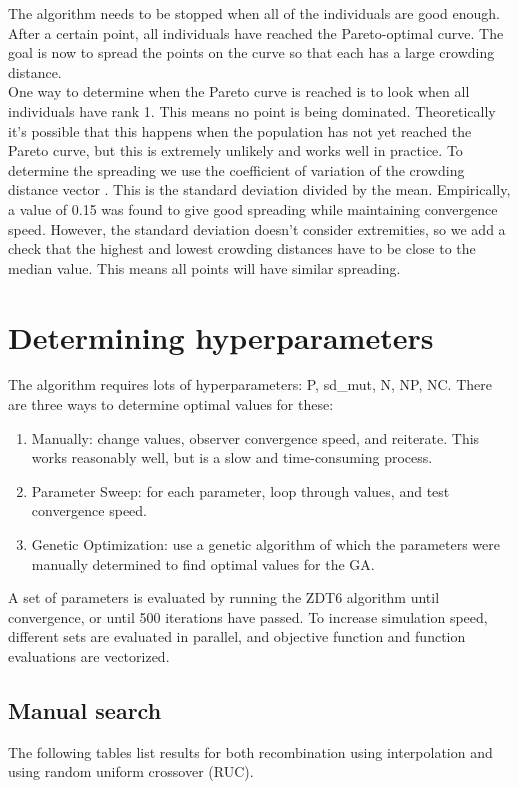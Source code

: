 The algorithm needs to be stopped when all of the individuals are good enough. After a certain point, all individuals have reached the Pareto-optimal curve. The goal is now to spread the points on the curve so that each has a large crowding distance. \\
One way to determine when the Pareto curve is reached is to look when all individuals have rank 1. This means no point is being dominated. Theoretically it's possible that this happens when the population has not yet reached the Pareto curve, but this is extremely unlikely and works well in practice. 
To determine the spreading we use the coefficient of variation of the crowding distance vector \cite{CV}. This is the standard deviation divided by the mean. Empirically, a value of 0.15 was found to give good spreading while maintaining convergence speed. However, the standard deviation doesn't consider extremities, so we add a check that the highest and lowest crowding distances have to be close to the median value. This means all points will have similar spreading.

\section{Determining hyperparameters} \label{hyperparameters}
The algorithm requires lots of hyperparameters: P, sd_mut, N, NP, NC. There are three ways to determine optimal values for these:
\begin{enumerate}
\item Manually: change values, observer convergence speed, and reiterate. This works reasonably well, but is a slow and time-consuming process.
\item Parameter Sweep: for each parameter, loop through values, and test convergence speed.
\item Genetic Optimization: use a genetic algorithm of which the parameters were manually determined to find optimal values for the GA.
\end{enumerate}
A set of parameters is evaluated by running the ZDT6 algorithm until convergence, or until 500 iterations have passed. To increase simulation speed, different sets are evaluated in parallel, and objective function and function evaluations are vectorized.

\subsection{Manual search}
The following tables list results for both recombination using interpolation and using random uniform crossover (RUC).

